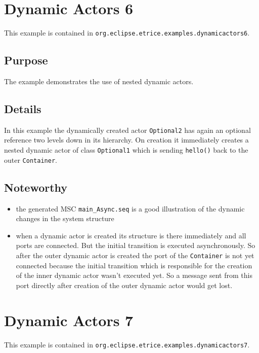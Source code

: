 \section{Dynamic Actors 6}

This example is contained in \texttt{org.eclipse.etrice.examples.dynamicactors6}.

\subsection{Purpose}

The example demonstrates the use of nested dynamic actors.

\subsection{Details}

In this example the dynamically created actor \texttt{Optional2} has again an optional reference two levels down in its hierarchy.
On creation it immediately creates a nested dynamic actor of class \texttt{Optional1} which is sending \texttt{hello()} back
to the outer \texttt{Container}.

\subsection{Noteworthy}

\begin{itemize}
\item the generated MSC \texttt{main\_Async.seq} is a good illustration of the dynamic changes in the system structure
\item when a dynamic actor is created its structure is there immediately and all ports are connected. But the initial transition
is executed asynchronously. So after the outer dynamic actor is created the port of the \texttt{Container} is not yet connected
because the initial transition which is responsible for the creation of the inner dynamic actor wasn't executed yet.
So a message sent from this port directly after creation of the outer dynamic actor would get lost.
\end{itemize}

\section{Dynamic Actors 7}

This example is contained in \texttt{org.eclipse.etrice.examples.dynamicactors7}.

